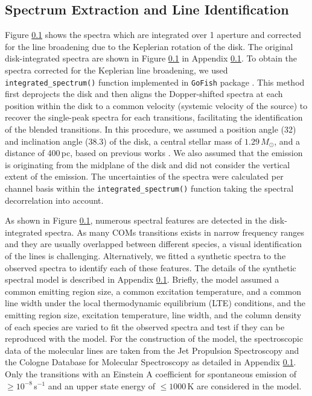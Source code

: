 \documentclass[linenumbers, twocolumn, times]{aastex631}
\begin{document}
\subsection{Spectrum Extraction and Line Identification}
Figure \ref{} shows the spectra which are integrated over 1 aperture and corrected for the line broadening due to the Keplerian rotation of the disk. The original disk-integrated spectra are shown in Figure \ref{} in Appendix \ref{}. To obtain the spectra corrected for the Keplerian line broadening, we used \texttt{integrated\_spectrum()} function implemented in \texttt{GoFish} package \citep{GoFish}. This method first deprojects the disk and then aligns the Dopper-shifted spectra at each position within the disk to a common velocity (systemic velocity of the source) to recover the single-peak spectra for each transitions, facilitating the identification of the blended transitions. In this procedure, we assumed a position angle (32\arcdeg) and inclination angle (38.3\arcdeg) of the disk, a central stellar mass of $1.29\,M_\odot$, and a distance of 400\,pc, based on previous works \citep{Cieza2016, Tobin2023}. We also assumed that the emission is originating from the midplane of the disk and did not consider the vertical extent of the emission. The uncertainties of the spectra were calculated per channel basis within the \texttt{integrated\_spectrum()} function taking the spectral decorrelation \citep{Yen2016} into account.

As shown in Figure \ref{}, numerous spectral features are detected in the disk-integrated spectra. As many COMs transitions exists in narrow frequency ranges and they are usually overlapped between different species, a visual identification of the lines is challenging. Alternatively, we fitted a synthetic spectra to the observed spectra to identify each of these features. The details of the synthetic spectral model is described in Appendix \ref{}. Briefly, the model assumed a common emitting region size, a common excitation temperature, and a common line width under the local thermodynamic equilibrium (LTE) conditions, and the emitting region size, excitation temperature, line width, and the column density of each species are varied to fit the observed spectra and test if they can be reproduced with the model. For the construction of the model, the spectroscopic data of the molecular lines are taken from the Jet Propulsion Spectroscopy \citep[JPL;][]{JPL} and the Cologne Database for Molecular Spectroscopy \citep[CDMS;][]{CDMS1, CDMS2} as detailed in Appendix \ref{}. Only the transitions with an Einstein A coefficient for spontaneous emission of $\geq10^{-8}$\,s$^{-1}$ and an upper state energy of $\leq1000$\,K are considered in the model.
\end{document}
